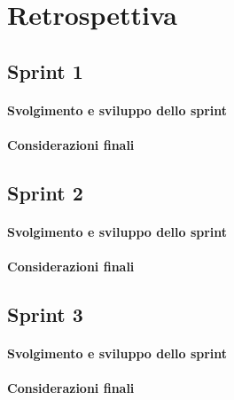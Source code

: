 \section{Retrospettiva}

\subsection{Sprint 1}
\paragraph{Svolgimento e sviluppo dello sprint}
\paragraph{Considerazioni finali}

\subsection{Sprint 2}
\paragraph{Svolgimento e sviluppo dello sprint}
\paragraph{Considerazioni finali}

\subsection{Sprint 3}
\paragraph{Svolgimento e sviluppo dello sprint}
\paragraph{Considerazioni finali}

